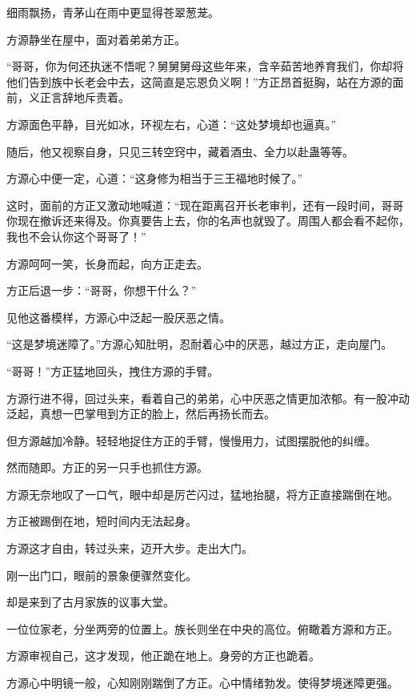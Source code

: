 
\begin{this_body}

细雨飘扬，青茅山在雨中更显得苍翠葱茏。

方源静坐在屋中，面对着弟弟方正。

“哥哥，你为何还执迷不悟呢？舅舅舅母这些年来，含辛茹苦地养育我们，你却将他们告到族中长老会中去，这简直是忘恩负义啊！”方正昂首挺胸，站在方源的面前，义正言辞地斥责着。

方源面色平静，目光如冰，环视左右，心道：“这处梦境却也逼真。”

随后，他又视察自身，只见三转空窍中，藏着酒虫、全力以赴蛊等等。

方源心中便一定，心道：“这身修为相当于三王福地时候了。”

这时，面前的方正又激动地喊道：“现在距离召开长老审判，还有一段时间，哥哥你现在撤诉还来得及。你真要告上去，你的名声也就毁了。周围人都会看不起你，我也不会认你这个哥哥了！”

方源呵呵一笑，长身而起，向方正走去。

方正后退一步：“哥哥，你想干什么？”

见他这番模样，方源心中泛起一股厌恶之情。

“这是梦境迷障了。”方源心知肚明，忍耐着心中的厌恶，越过方正，走向屋门。

“哥哥！”方正猛地回头，拽住方源的手臂。

方源行进不得，回过头来，看着自己的弟弟，心中厌恶之情更加浓郁。有一股冲动泛起，真想一巴掌甩到方正的脸上，然后再扬长而去。

但方源越加冷静。轻轻地捉住方正的手臂，慢慢用力，试图摆脱他的纠缠。

然而随即。方正的另一只手也抓住方源。

方源无奈地叹了一口气，眼中却是厉芒闪过，猛地抬腿，将方正直接踹倒在地。

方正被踢倒在地，短时间内无法起身。

方源这才自由，转过头来，迈开大步。走出大门。

刚一出门口，眼前的景象便骤然变化。

却是来到了古月家族的议事大堂。

一位位家老，分坐两旁的位置上。族长则坐在中央的高位。俯瞰着方源和方正。

方源审视自己，这才发现，他正跪在地上。身旁的方正也跪着。

方源心中明镜一般，心知刚刚踹倒了方正。心中情绪勃发。使得梦境迷障更强。


\end{this_body}
